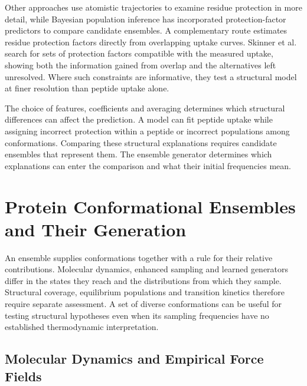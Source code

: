 Other approaches use atomistic trajectories to examine residue protection in more detail, while Bayesian population inference has incorporated protection-factor predictors to compare candidate ensembles.\supercite{mohammadiaraniInterpretingHydrogenDeuteriumExchange2018,wanReconcilingSimulatedEnsembles2020} A complementary route estimates residue protection factors directly from overlapping uptake curves. Skinner et al. search for sets of protection factors compatible with the measured uptake, showing both the information gained from overlap and the alternatives left unresolved. Where such constraints are informative, they test a structural model at finer resolution than peptide uptake alone.\supercite{skinnerEstimatingConstraintsProtection2019}

The choice of features, coefficients and averaging determines which structural differences can affect the prediction. A model can fit peptide uptake while assigning incorrect protection within a peptide or incorrect populations among conformations.\supercite{bradshawInterpretationHDXData2020} Comparing these structural explanations requires candidate ensembles that represent them. The ensemble generator determines which explanations can enter the comparison and what their initial frequencies mean.

\section{Protein Conformational Ensembles and Their Generation}
\label{sec:bg-ensemble-generation}

An ensemble supplies conformations together with a rule for their relative contributions. Molecular dynamics, enhanced sampling and learned generators differ in the states they reach and the distributions from which they sample. Structural coverage, equilibrium populations and transition kinetics therefore require separate assessment. A set of diverse conformations can be useful for testing structural hypotheses even when its sampling frequencies have no established thermodynamic interpretation.\supercite{heninEnhancedSamplingMethods2022,noeBoltzmannGeneratorsSampling2019}

\subsection{Molecular Dynamics and Empirical Force Fields}
\label{sec:bg-md}

